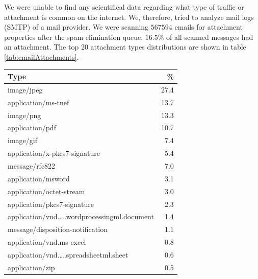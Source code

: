 We were unable to find any scientifical data regarding what type of traffic or attachment is common on the internet. We, therefore, tried to analyze mail logs (SMTP) of a mail provider. We were scanning $567594$ emails for attachment properties after the spam elimination queue. $16.5\%$ of all scanned messages had an attachment. The top 20 attachment types distributions are shown in table \ref{tab:emailAttachments}.
\begin{table}[H]
	
	\begin{tabular}{l|r}\hline
		Type                                                                        & \%\\\hline
		image/jpeg                                                                  &    27.4\\
		application/ms-tnef                                                            &    13.7\\
		image/png                                                                   &    13.3\\
		application/pdf                                                             &    10.7\\
		image/gif                                                                   &    7.4\\
		application/x-pkcs7-signature                                               &    5.4\\
		message/rfc822                                                              &    7.0\\
		application/msword                                                          &    3.1\\
		application/octet-stream                                                    &    3.0\\
		application/pkcs7-signature                                                 &    2.3\\
		application/vnd.\ldots.wordprocessingml.document                            &     1.4\\
		message/disposition-notification                                            &    1.1\\
		application/vnd.ms-excel                                                    &    0.8\\
		application/vnd.\ldots.spreadsheetml.sheet                                  &    0.6\\
		application/zip                                                             &    0.5\\

\end{tabular}
\end{table}
